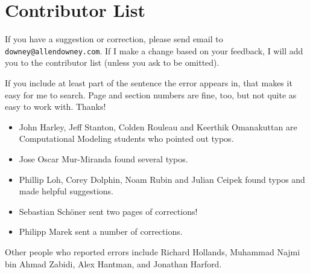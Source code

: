 \documentclass[12pt]{book}
\theoremstyle{exercise}
\begin{document}
\section*{Contributor List}


If you have a suggestion or correction, please send email to
{\tt downey@allendowney.com}.  If I make a change based on your
feedback, I will add you to the contributor list
(unless you ask to be omitted).

If you include at least part of the sentence the
error appears in, that makes it easy for me to search.  Page and
section numbers are fine, too, but not quite as easy to work with.
Thanks!

\small

\begin{itemize}

\item John Harley, Jeff Stanton, Colden Rouleau and
Keerthik Omanakuttan are Computational Modeling students who
pointed out typos.

\item Jose Oscar Mur-Miranda found several typos.

\item Phillip Loh, Corey Dolphin, Noam Rubin and Julian Ceipek
found typos and made helpful suggestions.


\item Sebastian Sch\"{o}ner sent two pages of corrections!

\item Philipp Marek sent a number of corrections.



\end{itemize}

Other people who reported errors include
Richard Hollands,
Muhammad Najmi bin Ahmad Zabidi,
Alex Hantman, and
Jonathan Harford.




\normalsize
\end{document}
